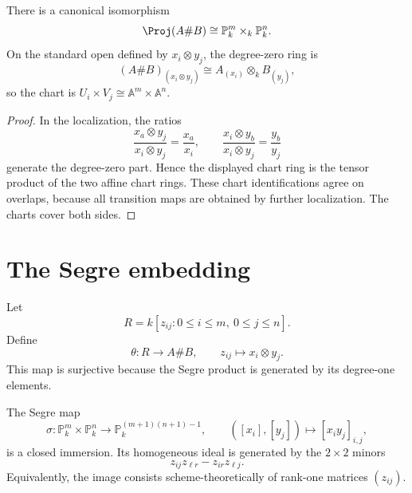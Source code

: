 \begin{proposition}\label{prop:vi38-segre-product}
There is a canonical isomorphism
\[
  \Proj(A\# B)\cong\mathbb P^m_k\times_k\mathbb P^n_k.
\]
On the standard open defined by \(x_i\otimes y_j\), the degree-zero ring is
\[
  (A\# B)_{(x_i\otimes y_j)}
  \cong A_{(x_i)}\otimes_k B_{(y_j)},
\]
so the chart is \(U_i\times V_j\cong\mathbb A^m\times\mathbb A^n\).
\end{proposition}

\begin{proof}
In the localization, the ratios
\[
  \frac{x_a\otimes y_j}{x_i\otimes y_j}=\frac{x_a}{x_i},
  \qquad
  \frac{x_i\otimes y_b}{x_i\otimes y_j}=\frac{y_b}{y_j}
\]
generate the degree-zero part.  Hence the displayed chart ring is the tensor product of the two affine chart rings.  These chart identifications agree on overlaps, because all transition maps are obtained by further localization.  The charts cover both sides.
\end{proof}

\section{The Segre embedding}
Let
\[
  R=k[z_{ij}:0\le i\le m,\ 0\le j\le n].
\]
Define
\[
  \theta:R\longrightarrow A\#B,
  \qquad z_{ij}\longmapsto x_i\otimes y_j.
\]
This map is surjective because the Segre product is generated by its degree-one elements.

\begin{theorem}\label{thm:vi38-segre}
The Segre map
\[
\sigma:\mathbb P^m_k\times\mathbb P^n_k
\longrightarrow\mathbb P^{(m+1)(n+1)-1}_k,
\qquad
([x_i],[y_j])\longmapsto[x_i y_j]_{i,j},
\]
is a closed immersion.  Its homogeneous ideal is generated by the \(2\times2\) minors
\[
  z_{ij}z_{\ell r}-z_{ir}z_{\ell j}.
\]
Equivalently, the image consists scheme-theoretically of rank-one matrices \((z_{ij})\).
\end{theorem}

